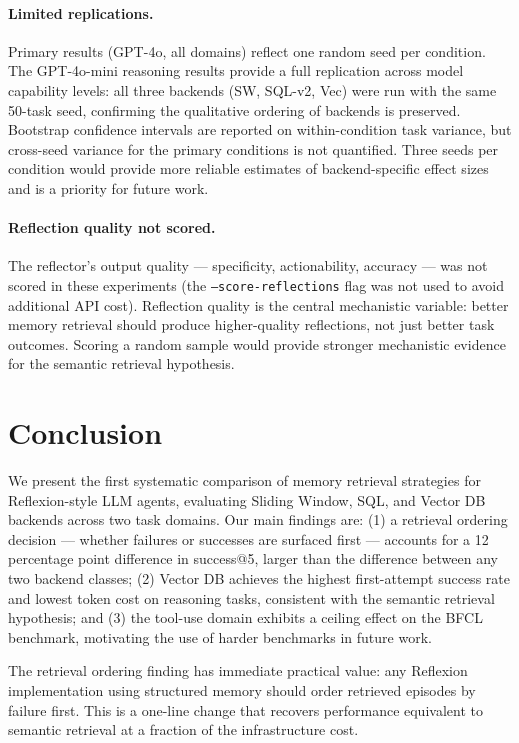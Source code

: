 \documentclass{article}
\begin{document}
\paragraph{Limited replications.}
Primary results (GPT-4o, all domains) reflect one random seed per condition.
The GPT-4o-mini reasoning results provide a full replication across model
capability levels: all three backends (SW, SQL-v2, Vec) were run with the
same 50-task seed, confirming the qualitative ordering of backends is
preserved. Bootstrap confidence intervals are reported on within-condition
task variance, but cross-seed variance for the primary conditions is not
quantified. Three seeds per condition would provide more reliable estimates
of backend-specific effect sizes and is a priority for future work.

\paragraph{Reflection quality not scored.}
The reflector's output quality --- specificity, actionability, accuracy --- was not
scored in these experiments (the \texttt{--score-reflections} flag was not used
to avoid additional API cost). Reflection quality is the central mechanistic
variable: better memory retrieval should produce higher-quality reflections,
not just better task outcomes. Scoring a random sample would provide stronger
mechanistic evidence for the semantic retrieval hypothesis.

\section{Conclusion}
\label{sec:conclusion}

We present the first systematic comparison of memory retrieval strategies for
Reflexion-style LLM agents, evaluating Sliding Window, SQL, and Vector DB
backends across two task domains. Our main findings are: (1) a retrieval
ordering decision --- whether failures or successes are surfaced first --- accounts
for a 12 percentage point difference in success@5, larger than the difference
between any two backend classes; (2) Vector DB achieves the highest
first-attempt success rate and lowest token cost on reasoning tasks, consistent
with the semantic retrieval hypothesis; and (3) the tool-use domain exhibits a
ceiling effect on the BFCL benchmark, motivating the use of harder benchmarks
in future work.

The retrieval ordering finding has immediate practical value: any Reflexion
implementation using structured memory should order retrieved episodes by
failure first. This is a one-line change that recovers performance equivalent
to semantic retrieval at a fraction of the infrastructure cost.
\end{document}
